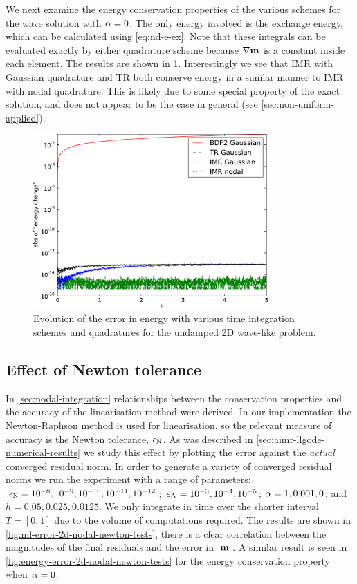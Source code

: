 We next examine the energy conservation properties of the various schemes for the wave solution with $\alpha = 0$.
The only energy involved is the exchange energy, which can be calculated using \cref{eq:nd-e-ex}.
Note that these integrals can be evaluated exactly by either quadrature scheme because $\nabla \boldsymbol{\mathrm{m}}$ is a constant inside each element.
The results are shown in \cref{fig:energy-error-2d}.
Interestingly we see that IMR with Gaussian quadrature and TR both conserve energy in a similar manner to IMR with nodal quadrature.
This is likely due to some special property of the exact solution, and does not appear to be the case in general (see \cref{sec:non-uniform-applied}).
\begin{figure}
  \centering
  \includegraphics[width=0.8\textwidth]{plots/2d_wave_solution_energy/absofenergychangevstimes}
  \caption{Evolution of the error in energy with various time integration schemes and quadratures for the undamped 2D wave-like problem.
}
  \label{fig:energy-error-2d}
\end{figure}


\subsection{Effect of Newton tolerance}
\label{sec:effect-newt-toler-m-conservation}

In \cref{sec:nodal-integration} relationships between the conservation properties and the accuracy of the linearisation method were derived.
In our implementation the Newton-Raphson method is used for linearisation, so the relevant measure of accuracy is the Newton tolerance, $\epsilon_{\mathrm{N}}$.
As was described in \cref{sec:aimr-llgode-numerical-results} we study this effect by plotting the error against the \emph{actual} converged residual norm.
In order to generate a variety of converged residual norms we run the experiment with a range of parameters: $\epsilon_{\mathrm{N}} = 10^{-8}, 10^{-9}, 10^{-10}, 10^{-11}, 10^{-12}$; $\epsilon_{\Delta_{}} = 10^{-3}, 10^{-4}, 10^{-5}$; $\alpha = 1, 0.001, 0$; and $h = 0.05, 0.025, 0.0125$.
We only integrate in time over the shorter interval $T = [0, 1]$ due to the volume of computations required.
The results are shown in \cref{fig:ml-error-2d-nodal-newton-tests}, there is a clear correlation between the magnitudes of the final residuals and the error in $\left|{\boldsymbol{\mathrm{m}}} \right|$.
A similar result is seen in \cref{fig:energy-error-2d-nodal-newton-tests} for the energy conservation property when $\alpha = 0$.

